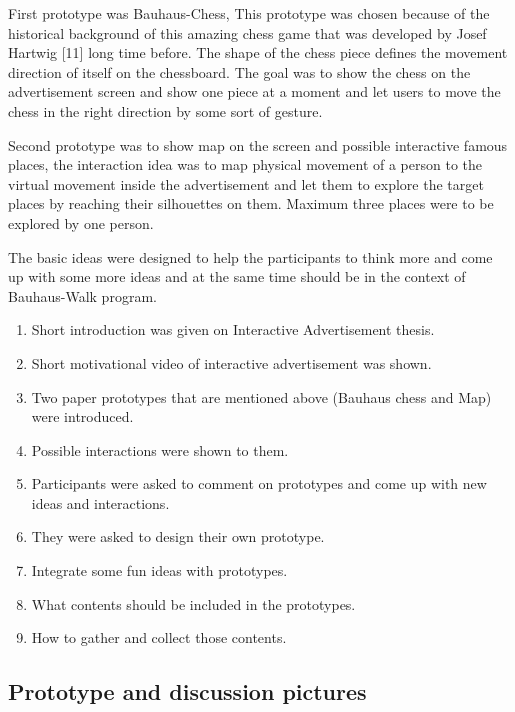 First prototype was Bauhaus-Chess, This prototype was chosen because of the historical background of this amazing chess game that was developed by Josef Hartwig [11] long time before. The shape of the chess piece defines the movement direction of itself on the chessboard. The goal was to show the chess on the advertisement screen and show one piece at a moment and let users to move the chess in the right direction by some sort of gesture. 

Second prototype was to show map on the screen and possible interactive famous places, the interaction idea was to map physical movement of a person to the virtual movement inside the advertisement and let them to explore the target places by reaching their silhouettes on them. Maximum three places were to be explored by one person.

The basic ideas were designed to help the participants to think more and come up with some more ideas and at the same time should be in the context of Bauhaus-Walk program. 


\begin{enumerate}
\item Short introduction was given on Interactive Advertisement thesis.
\item	Short motivational video of interactive advertisement was shown.
\item	Two paper prototypes that are mentioned above (Bauhaus chess and Map) were introduced.
\item	Possible interactions were shown to them.
\item	Participants were asked to comment on prototypes and come up with new ideas and interactions.
\item	They were asked to design their own prototype.
\item	Integrate some fun ideas with prototypes.
\item	What contents should be included in the prototypes.
\item	How to gather and collect those contents.
\end{enumerate}

\newpage
\subsection{Prototype and discussion pictures}

